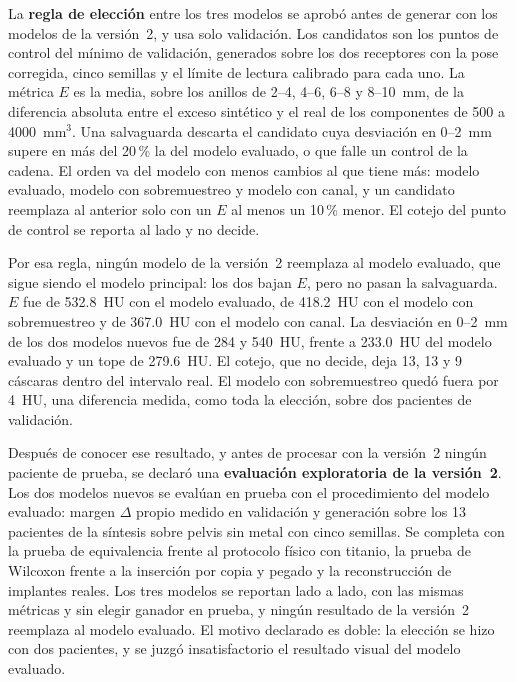 La \textbf{regla de elección} entre los tres modelos se aprobó antes de generar con los modelos de la versión~2, y usa solo validación. Los candidatos son los puntos de control del mínimo de validación, generados sobre los dos receptores con la pose corregida, cinco semillas y el límite de lectura calibrado para cada uno. La métrica $E$ es la media, sobre los anillos de 2--4, 4--6, 6--8 y 8--10~mm, de la diferencia absoluta entre el exceso sintético y el real de los componentes de 500 a 4000~mm$^3$. Una salvaguarda descarta el candidato cuya desviación en 0--2~mm supere en más del 20\,\% la del modelo evaluado, o que falle un control de la cadena. El orden va del modelo con menos cambios al que tiene más: modelo evaluado, modelo con sobremuestreo y modelo con canal, y un candidato reemplaza al anterior solo con un $E$ al menos un 10\,\% menor. El cotejo del punto de control se reporta al lado y no decide.

Por esa regla, ningún modelo de la versión~2 reemplaza al modelo evaluado, que sigue siendo el modelo principal: los dos bajan $E$, pero no pasan la salvaguarda. $E$ fue de 532.8~HU con el modelo evaluado, de 418.2~HU con el modelo con sobremuestreo y de 367.0~HU con el modelo con canal. La desviación en 0--2~mm de los dos modelos nuevos fue de 284 y 540~HU, frente a 233.0~HU del modelo evaluado y un tope de 279.6~HU. El cotejo, que no decide, deja 13, 13 y 9 cáscaras dentro del intervalo real. El modelo con sobremuestreo quedó fuera por 4~HU, una diferencia medida, como toda la elección, sobre dos pacientes de validación.

Después de conocer ese resultado, y antes de procesar con la versión~2 ningún paciente de prueba, se declaró una \textbf{evaluación exploratoria de la versión~2}. Los dos modelos nuevos se evalúan en prueba con el procedimiento del modelo evaluado: margen $\Delta$ propio medido en validación y generación sobre los 13 pacientes de la síntesis sobre pelvis sin metal con cinco semillas. Se completa con la prueba de equivalencia frente al protocolo físico con titanio, la prueba de Wilcoxon frente a la inserción por copia y pegado y la reconstrucción de implantes reales. Los tres modelos se reportan lado a lado, con las mismas métricas y sin elegir ganador en prueba, y ningún resultado de la versión~2 reemplaza al modelo evaluado. El motivo declarado es doble: la elección se hizo con dos pacientes, y se juzgó insatisfactorio el resultado visual del modelo evaluado.


